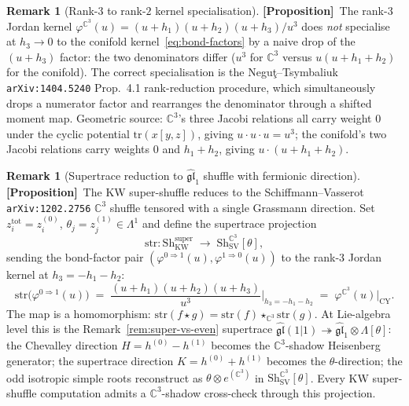 \documentclass[11pt]{amsart}
\theoremstyle{definition}
\newtheorem{remark}[theorem]{Remark}
\providecommand{\bC}{\mathbb{C}}
\providecommand{\fgl}{\mathfrak{gl}}
\providecommand{\ClaimStatusProposition}{\textbf{\textsf{[Proposition]}}}
\begin{document}
\begin{remark}[Rank-$3$ to rank-$2$ kernel specialisation]
\label{rem:bond-three-term-ladder}
\ClaimStatusProposition\
The rank-$3$ Jordan kernel
$\varphi^{\bC^3}(u) = (u + h_1)(u + h_2)(u + h_3)/u^3$ does \emph{not}
specialise at $h_3 \to 0$ to the conifold kernel~\eqref{eq:bond-factors}
by a naive drop of the $(u + h_3)$ factor: the two denominators differ
($u^3$ for $\bC^3$ versus $u(u + h_1 + h_2)$ for the conifold). The
correct specialisation is the Negu\c{t}--Tsymbaliuk
\texttt{arXiv:1404.5240} Prop.~4.1 rank-reduction procedure, which
simultaneously drops a numerator factor and rearranges the denominator
through a shifted moment map. Geometric source: $\bC^3$'s three Jacobi
relations all carry weight $0$ under the cyclic potential
$\mathrm{tr}(x[y, z])$, giving $u \cdot u \cdot u = u^3$; the
conifold's two Jacobi relations carry weights $0$ and $h_1 + h_2$,
giving $u \cdot (u + h_1 + h_2)$.
\end{remark}

\begin{remark}[Supertrace reduction to $\widehat{\fgl}_1$ shuffle with fermionic direction]
\label{rem:supertrace-reduction}
\ClaimStatusProposition\
The KW super-shuffle reduces to the Schiffmann--Vasserot
\texttt{arXiv:1202.2756} $\bC^3$ shuffle tensored with a single
Grassmann direction. Set $z^{\mathrm{tot}}_i = z^{(0)}_i$,
$\theta_j = z^{(1)}_j \in \Lambda^1$ and define the supertrace
projection
\[
  \mathrm{str} \colon
  \mathrm{Sh}^{\mathrm{super}}_{\mathrm{KW}}
  \;\longrightarrow\;
  \mathrm{Sh}^{\bC^3}_{\mathrm{SV}}[\theta],
\]
sending the bond-factor pair
$(\varphi^{0 \Rightarrow 1}(u), \varphi^{1 \Rightarrow 0}(u))$ to the
rank-$3$ Jordan kernel at $h_3 = -h_1 - h_2$:
\[
  \mathrm{str}\bigl(\varphi^{0 \Rightarrow 1}(u)\bigr)
  \;=\;
  \frac{(u + h_1)(u + h_2)(u + h_3)}{u^3}\bigg|_{h_3 = -h_1 - h_2}
  \;=\;
  \varphi^{\bC^3}(u)\bigr|_{\mathrm{CY}}.
\]
The map is a homomorphism:
$\mathrm{str}(f \star g) = \mathrm{str}(f) \star_{\bC^3} \mathrm{str}(g)$.
At Lie-algebra level this is the Remark~\ref{rem:super-vs-even}
supertrace $\widehat{\fgl}(1|1) \twoheadrightarrow
\widehat{\fgl}_1 \otimes \Lambda[\theta]$: the Chevalley direction
$H = h^{(0)} - h^{(1)}$ becomes the $\bC^3$-shadow Heisenberg
generator; the supertrace direction $K = h^{(0)} + h^{(1)}$ becomes
the $\theta$-direction; the odd isotropic simple roots reconstruct as
$\theta \otimes e^{(\bC^3)}$ in
$\mathrm{Sh}^{\bC^3}_{\mathrm{SV}}[\theta]$. Every KW super-shuffle
computation admits a $\bC^3$-shadow cross-check through this
projection.
\end{remark}
\end{document}
